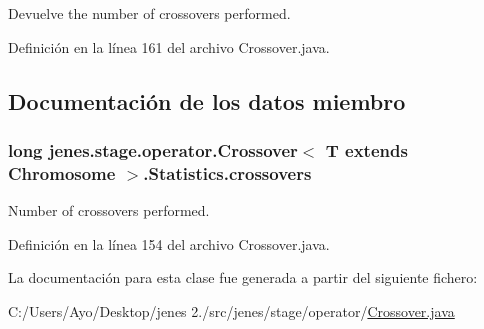 \begin{DoxyReturn}{Devuelve}
the number of crossovers performed. 
\end{DoxyReturn}


Definición en la línea 161 del archivo Crossover.\-java.



\subsection{Documentación de los datos miembro}
\hypertarget{classjenes_1_1stage_1_1operator_1_1_crossover_3_01_t_01extends_01_chromosome_01_4_1_1_statistics_abf1983cc628b3283b942dc68cc871bbc}{
\subsubsection[{crossovers}]{\setlength{\rightskip}{0pt plus 5cm}long jenes.\-stage.\-operator.\-Crossover$<$ T extends Chromosome $>$.Statistics.\-crossovers\hspace{0.3cm}{\ttfamily [protected]}}}\label{classjenes_1_1stage_1_1operator_1_1_crossover_3_01_t_01extends_01_chromosome_01_4_1_1_statistics_abf1983cc628b3283b942dc68cc871bbc}
Number of crossovers performed. 

Definición en la línea 154 del archivo Crossover.\-java.



La documentación para esta clase fue generada a partir del siguiente fichero\-:\begin{DoxyCompactItemize}
\item 
C\-:/\-Users/\-Ayo/\-Desktop/jenes 2./src/jenes/stage/operator/\hyperlink{_crossover_8java}{Crossover.\-java}\end{DoxyCompactItemize}
